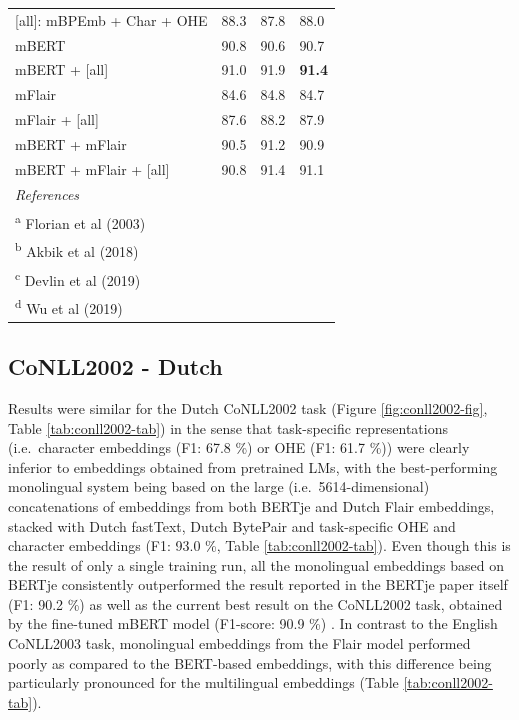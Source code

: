\documentclass[12pt,a4paper,]{book}
\begin{document}
\begin{table}
\begin{tabular}[t]{llll}
\hspace{1em}[all]: mBPEmb + Char + OHE & 88.3 & 87.8 & 88.0\\
\hspace{1em}mBERT & 90.8 & 90.6 & 90.7\\
\hspace{1em}mBERT + [all] & 91.0 & 91.9 & \textbf{91.4}\\
\hspace{1em}mFlair & 84.6 & 84.8 & 84.7\\
\hspace{1em}mFlair + [all] & 87.6 & 88.2 & 87.9\\
\hspace{1em}mBERT + mFlair & 90.5 & 91.2 & 90.9\\
\hspace{1em}mBERT + mFlair + [all] & 90.8 & 91.4 & 91.1\\
\bottomrule
\multicolumn{4}{l}{\textit{References}}\\
\multicolumn{4}{l}{\textsuperscript{a} Florian et al (2003)}\\
\multicolumn{4}{l}{\textsuperscript{b} Akbik et al (2018)}\\
\multicolumn{4}{l}{\textsuperscript{c} Devlin et al (2019)}\\
\multicolumn{4}{l}{\textsuperscript{d} Wu et al (2019)}\\
\end{tabular}
\end{table}



\hypertarget{conll2002---dutch}{%
\subsection{CoNLL2002 - Dutch}\label{conll2002---dutch}}

Results were similar for the Dutch CoNLL2002 task (Figure \ref{fig:conll2002-fig}, Table \ref{tab:conll2002-tab}) in the sense that task-specific representations (i.e.~character embeddings (F1: 67.8 \%) or OHE (F1: 61.7 \%)) were clearly inferior to embeddings obtained from pretrained LMs, with the best-performing monolingual system being based on the large (i.e.~5614-dimensional) concatenations of embeddings from both BERTje and Dutch Flair embeddings, stacked with Dutch fastText, Dutch BytePair and task-specific OHE and character embeddings (F1: 93.0 \%, Table \ref{tab:conll2002-tab}). Even though this is the result of only a single training run, all the monolingual embeddings based on BERTje consistently outperformed the result reported in the BERTje paper itself (F1: 90.2 \%) \citep{devries2019} as well as the current best result on the CoNLL2002 task, obtained by the fine-tuned mBERT model (F1-score: 90.9 \%) \citep{wu2019}. In contrast to the English CoNLL2003 task, monolingual embeddings from the Flair model performed poorly as compared to the BERT-based embeddings, with this difference being particularly pronounced for the multilingual embeddings (Table \ref{tab:conll2002-tab}).
\end{document}
